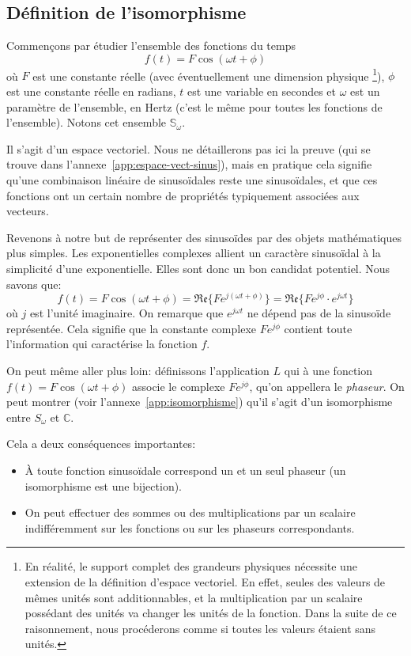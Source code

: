\subsection{Définition de l'isomorphisme}
Commençons par étudier l'ensemble des fonctions du temps
\[
    f(t) = F\cos(\omega t + \phi)
\]
où $F$ est une constante réelle (avec éventuellement une dimension physique
\footnote{
    En réalité, le support complet des grandeurs physiques
    nécessite une extension de la définition d'espace vectoriel.
    En effet, seules des valeurs de mêmes unités sont additionnables,
    et la multiplication par un scalaire possédant des unités
    va changer les unités de la fonction.
    Dans la suite de ce raisonnement,
    nous procéderons comme si toutes les valeurs étaient sans unités.
}),
$\phi$ est une constante réelle en radians,
$t$ est une variable en secondes
et $\omega$ est un paramètre de l'ensemble, en Hertz
(c'est le même pour toutes les fonctions de l'ensemble).
Notons cet ensemble $\mathbb{S}_\omega$.

Il s'agit d'un espace vectoriel.
Nous ne détaillerons pas ici la preuve
(qui se trouve dans l'annexe~\ref{app:espace-vect-sinus}),
mais en pratique cela signifie qu'une combinaison linéaire
de sinusoïdales reste une sinusoïdales,
et que ces fonctions ont un certain nombre de propriétés
typiquement associées aux vecteurs.

Revenons à notre but de représenter des sinusoïdes
par des objets mathématiques plus simples.
Les exponentielles complexes allient un caractère sinusoïdal à
la simplicité d'une exponentielle.
Elles sont donc un bon candidat potentiel.
Nous savons que:
\[
    f(t) = F\cos(\omega t + \phi) = \mathfrak{Re}\{Fe^{j(\omega t + \phi)}\}
    = \mathfrak{Re}\{Fe^{j\phi}\cdot e^{j\omega t}\}
\]
où $j$ est l'unité imaginaire.
On remarque que $e^{j\omega t}$ ne dépend pas de la sinusoïde représentée.
Cela signifie que la constante complexe $Fe^{j\phi}$ contient
toute l'information qui caractérise la fonction $f$.

On peut même aller plus loin: définissons l'application $L$
qui à une fonction $f(t) = F\cos(\omega t + \phi)$
associe le complexe $Fe^{j\phi}$,
qu'on appellera le \emph{phaseur}.
On peut montrer (voir l'annexe~\ref{app:isomorphisme}) qu'il s'agit d'un
isomorphisme entre $S_\omega$ et $\mathbb{C}$.

Cela a deux conséquences importantes:
\begin{itemize}
    \item À toute fonction sinusoïdale correspond un et un seul phaseur
        (un isomorphisme est une bijection).
    \item On peut effectuer des sommes ou des multiplications par un scalaire
        indifféremment sur les fonctions ou sur les phaseurs correspondants.
\end{itemize}

